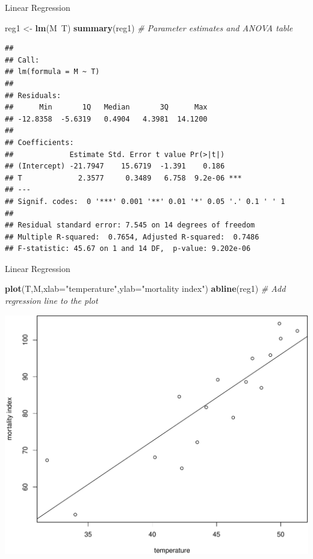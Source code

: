 \documentclass[9pt,ignorenonframetext,]{beamer}
\newenvironment{Shaded}{\begin{snugshade}}{\end{snugshade}}
\newcommand{\KeywordTok}[1]{\textcolor[rgb]{0.13,0.29,0.53}{\textbf{{#1}}}}
\newcommand{\DataTypeTok}[1]{\textcolor[rgb]{0.13,0.29,0.53}{{#1}}}
\newcommand{\StringTok}[1]{\textcolor[rgb]{0.31,0.60,0.02}{{#1}}}
\newcommand{\CommentTok}[1]{\textcolor[rgb]{0.56,0.35,0.01}{\textit{{#1}}}}
\newcommand{\NormalTok}[1]{{#1}}
\begin{document}
\begin{frame}[fragile]{Linear Regression}

\begin{Shaded}
\begin{Highlighting}[]
\NormalTok{reg1 <-}\StringTok{ }\KeywordTok{lm}\NormalTok{(M~T)}
\KeywordTok{summary}\NormalTok{(reg1) }\CommentTok{# Parameter estimates and ANOVA table}
\end{Highlighting}
\end{Shaded}

\begin{verbatim}
## 
## Call:
## lm(formula = M ~ T)
## 
## Residuals:
##      Min       1Q   Median       3Q      Max 
## -12.8358  -5.6319   0.4904   4.3981  14.1200 
## 
## Coefficients:
##             Estimate Std. Error t value Pr(>|t|)    
## (Intercept) -21.7947    15.6719  -1.391    0.186    
## T             2.3577     0.3489   6.758  9.2e-06 ***
## ---
## Signif. codes:  0 '***' 0.001 '**' 0.01 '*' 0.05 '.' 0.1 ' ' 1
## 
## Residual standard error: 7.545 on 14 degrees of freedom
## Multiple R-squared:  0.7654, Adjusted R-squared:  0.7486 
## F-statistic: 45.67 on 1 and 14 DF,  p-value: 9.202e-06
\end{verbatim}

\end{frame}

\begin{frame}[fragile]{Linear Regression}

\begin{Shaded}
\begin{Highlighting}[]
\KeywordTok{plot}\NormalTok{(T,M,}\DataTypeTok{xlab=}\StringTok{"temperature"}\NormalTok{,}\DataTypeTok{ylab=}\StringTok{"mortality index"}\NormalTok{)}
\KeywordTok{abline}\NormalTok{(reg1) }\CommentTok{# Add regression line to the plot}
\end{Highlighting}
\end{Shaded}

\includegraphics{class2-jan11_files/figure-beamer/unnamed-chunk-17-1.pdf}

\end{frame}
\end{document}
